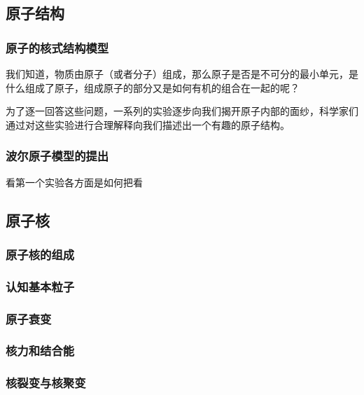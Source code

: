 \begin{issues}
\issueTODO
\end{issues}

\subsection{原子结构}
\subsubsection{原子的核式结构模型}
我们知道，物质由原子（或者分子）组成，那么原子是否是不可分的最小单元，是什么组成了原子，组成原子的部分又是如何有机的组合在一起的呢？

为了逐一回答这些问题，一系列的实验逐步向我们揭开原子内部的面纱，科学家们通过对这些实验进行合理解释向我们描述出一个有趣的原子结构。
\subsubsection{波尔原子模型的提出}%
看第一个实验各方面是如何把看
\subsection{原子核}
\subsubsection{原子核的组成}
\subsubsection{认知基本粒子}
\subsubsection{原子衰变}
\subsubsection{核力和结合能}
\subsubsection{核裂变与核聚变}